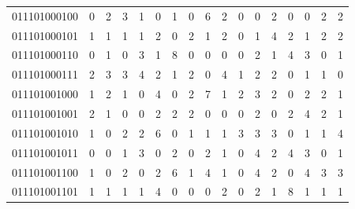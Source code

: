 \documentclass[10pt,a4paper]{article}
\begin{document}
\begin{longtable}{ |c|c|c|c|c|c|c|c|c|c|c|c|c|c|c|c|c| }
    011101000100              & 0                            & 2                                & 3                            & 1                              & 0   & 1   & 0   & 6   & 2   & 0   & 0   & 2   & 0   & 0   & 2   & 2   \\
    011101000101              & 1                            & 1                                & 1                            & 1                              & 2   & 0   & 2   & 1   & 2   & 0   & 1   & 4   & 2   & 1   & 2   & 2   \\
    011101000110              & 0                            & 1                                & 0                            & 3                              & 1   & 8   & 0   & 0   & 0   & 0   & 2   & 1   & 4   & 3   & 0   & 1   \\
    011101000111              & 2                            & 3                                & 3                            & 4                              & 2   & 1   & 2   & 0   & 4   & 1   & 2   & 2   & 0   & 1   & 1   & 0   \\
    011101001000              & 1                            & 2                                & 1                            & 0                              & 4   & 0   & 2   & 7   & 1   & 2   & 3   & 2   & 0   & 2   & 2   & 1   \\
    011101001001              & 2                            & 1                                & 0                            & 0                              & 2   & 2   & 2   & 0   & 0   & 0   & 2   & 0   & 2   & 4   & 2   & 1   \\
    011101001010              & 1                            & 0                                & 2                            & 2                              & 6   & 0   & 1   & 1   & 1   & 3   & 3   & 3   & 0   & 1   & 1   & 4   \\
    011101001011              & 0                            & 0                                & 1                            & 3                              & 0   & 2   & 0   & 2   & 1   & 0   & 4   & 2   & 4   & 3   & 0   & 1   \\
    011101001100              & 1                            & 0                                & 2                            & 0                              & 2   & 6   & 1   & 4   & 1   & 0   & 4   & 2   & 0   & 4   & 3   & 3   \\
    011101001101              & 1                            & 1                                & 1                            & 1                              & 4   & 0   & 0   & 0   & 2   & 0   & 2   & 1   & 8   & 1   & 1   & 1   \\

\end{longtable}
\end{document}
